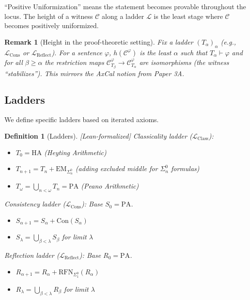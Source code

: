 \documentclass[11pt]{article}
\newtheorem{definition}[theorem]{Definition}
\newtheorem{remark}[theorem]{Remark}
\newcommand{\PA}{\mathrm{PA}}
\newcommand{\HA}{\mathrm{HA}}
\newcommand{\Con}{\mathrm{Con}}
\newcommand{\RFNSigOne}{\mathrm{RFN}_{\Sigma^0_1}}
\newcommand{\LCons}{\mathcal{L}_{\mathrm{Cons}}}
\newcommand{\LReflect}{\mathcal{L}_{\mathrm{Reflect}}}
\newcommand{\LClass}{\mathcal{L}_{\mathrm{Class}}}
\newcommand{\EM}{\mathrm{EM}}
\newcommand{\leanok}{\textsf{\textcolor{green!70!black}{[Lean-formalized]}}}
\begin{document}
``Positive Uniformization'' means the statement becomes provable throughout the locus. The height of a witness $\mathcal{C}$ along a ladder $\mathcal{L}$ is the least stage where $\mathcal{C}$ becomes positively uniformized.

\begin{remark}[Height in the proof-theoretic setting]
Fix a ladder $(T_\alpha)_\alpha$ (e.g., $\LCons$ or $\LReflect$). For a sentence $\varphi$, $h(\mathcal C^\varphi)$ is the least $\alpha$ such that $T_\alpha \vdash \varphi$ and for all $\beta\ge \alpha$ the restriction maps $\mathcal C^\varphi_{T_\beta}\to \mathcal C^\varphi_{T_\alpha}$ are isomorphisms (the witness ``stabilizes''). This mirrors the AxCal notion from Paper 3A.
\end{remark}

\subsection{Ladders}

We define specific ladders based on iterated axioms.

\begin{definition}[Ladders] \leanok
\emph{Classicality ladder ($\LClass$):} 
\begin{itemize}
\item $T_0 = \HA$ (Heyting Arithmetic)
\item $T_{n+1} = T_n + \EM_{\Sigma^0_n}$ (adding excluded middle for $\Sigma^0_n$ formulas)
\item $T_\omega = \bigcup_{n<\omega} T_n = \PA$ (Peano Arithmetic)
\end{itemize}

\emph{Consistency ladder ($\LCons$):} Base $S_0=\PA$.
\begin{itemize}
\item $S_{\alpha+1} = S_\alpha + \Con(S_\alpha)$
\item $S_\lambda = \bigcup_{\beta<\lambda} S_\beta$ for limit $\lambda$
\end{itemize}

\emph{Reflection ladder ($\LReflect$):} Base $R_0=\PA$.
\begin{itemize}
\item $R_{\alpha+1} = R_\alpha + \RFNSigOne(R_\alpha)$
\item $R_\lambda = \bigcup_{\beta<\lambda} R_\beta$ for limit $\lambda$
\end{itemize}
\end{definition}
\end{document}
